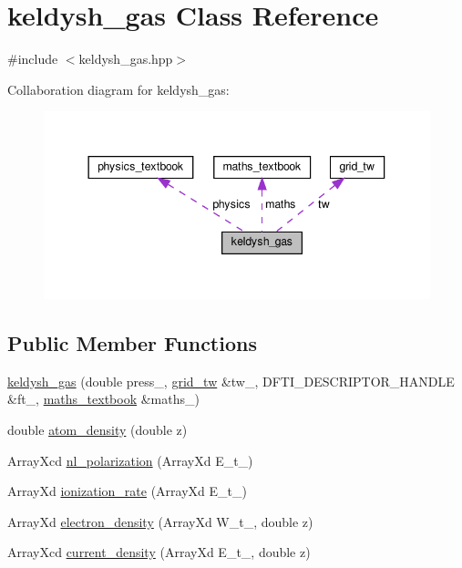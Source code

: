 \hypertarget{classkeldysh__gas}{}\section{keldysh\+\_\+gas Class Reference}
\label{classkeldysh__gas}


{\ttfamily \#include $<$keldysh\+\_\+gas.\+hpp$>$}



Collaboration diagram for keldysh\+\_\+gas\+:\nopagebreak
\begin{figure}[H]
\begin{center}
\leavevmode
\includegraphics[width=344pt]{classkeldysh__gas__coll__graph}
\end{center}
\end{figure}
\subsection*{Public Member Functions}
\begin{DoxyCompactItemize}
\item 
\hyperlink{classkeldysh__gas_a8175a1520a2a7cd90b81d9af3ac64c91}{keldysh\+\_\+gas} (double press\+\_\+, \hyperlink{classgrid__tw}{grid\+\_\+tw} \&tw\+\_\+, D\+F\+T\+I\+\_\+\+D\+E\+S\+C\+R\+I\+P\+T\+O\+R\+\_\+\+H\+A\+N\+D\+LE \&ft\+\_\+, \hyperlink{classmaths__textbook}{maths\+\_\+textbook} \&maths\+\_\+)
\item 
double \hyperlink{classkeldysh__gas_acfa0604a6f00bce28b72b9a07fb79314}{atom\+\_\+density} (double z)
\item 
Array\+Xcd \hyperlink{classkeldysh__gas_a1cd65d1983cb6c5ff9d04eeb29e94dd5}{nl\+\_\+polarization} (Array\+Xd E\+\_\+t\+\_\+)
\item 
Array\+Xd \hyperlink{classkeldysh__gas_a42dc79816adcae9c25499baa7256ec10}{ionization\+\_\+rate} (Array\+Xd E\+\_\+t\+\_\+)
\item 
Array\+Xd \hyperlink{classkeldysh__gas_a8dddacdfabea4d6c3049088cc868715a}{electron\+\_\+density} (Array\+Xd W\+\_\+t\+\_\+, double z)
\item 
Array\+Xcd \hyperlink{classkeldysh__gas_a7d5f16951d622544d814518a37768411}{current\+\_\+density} (Array\+Xd E\+\_\+t\+\_\+, double z)
\end{DoxyCompactItemize}
